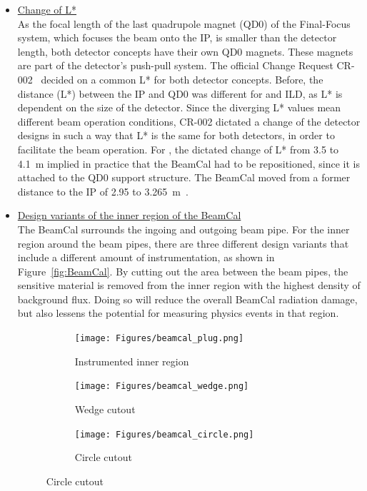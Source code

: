 \begin{itemize}
 \item \underline{Change of L*}\\
 As the focal length of the last quadrupole magnet (QD0) of the Final-Focus system, which focuses the beam onto the IP, is smaller than the detector length, both detector concepts have their own QD0 magnets.
 These magnets are part of the detector's push-pull system.
 The official Change Request CR-002~\cite{CR-002} decided on a common L* for both detector concepts.
 Before, the distance (L*) between the IP and QD0 was different for \sid and ILD, as L* is dependent on the size of the detector.
 Since the diverging L* values mean different beam operation conditions, CR-002 dictated a change of the detector designs in such a way that L* is the same for both detectors, in order to facilitate the beam operation.
 For \sid, the dictated change of L* from 3.5 to \SI{4.1}{\meter} implied in practice that the BeamCal had to be repositioned, since it is attached to the QD0 support structure. 
 The BeamCal moved from a former distance to the IP of 2.95 to \SI{3.265}{\meter}~\cite{SiDBkgNote}.
 \item \underline{Design variants of the inner region of the BeamCal}\\
 The BeamCal surrounds the ingoing and outgoing beam pipe.
 For the inner region around the beam pipes, there are three different design variants that include a different amount of instrumentation, as shown in Figure~\ref{fig:BeamCal}.
 By cutting out the area between the beam pipes, the sensitive material is removed from the inner region with the highest density of background flux.
 Doing so will reduce the overall BeamCal radiation damage, but also lessens the potential for measuring physics events in that region.
 \begin{figure}
 \centering
  \begin{subfigure}[b]{0.3\textwidth}
   \centering
    \texttt{[image: Figures/beamcal\_plug.png]}
   \caption{Instrumented inner region}
  \end{subfigure}
  \begin{subfigure}[b]{0.3\textwidth}
   \centering
    \texttt{[image: Figures/beamcal\_wedge.png]}
   \caption{Wedge cutout}
   \end{subfigure}
    \begin{subfigure}[b]{0.3\textwidth}
   \centering
    \texttt{[image: Figures/beamcal\_circle.png]}
   \caption{Circle cutout}
   \end{subfigure}

\end{figure}
\end{itemize}
